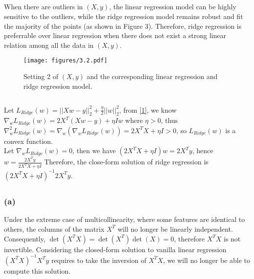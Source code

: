 \documentclass{article}
\begin{document}
        \subsection{}
        When there are outliers in $(X, y)$, the linear regression model can be highly sensitive to the outliers, 
        while the ridge regression model remains robust and fit the majority of the points (as shown in Figure 3). 
        Therefore, ridge regression is preferrable over linear regression when there does not exist a strong linear relation among all the data in $(X, y)$. 
        \vspace{-10pt}
        \begin{figure}[hbt!]
            \centering
            \texttt{[image: figures/3.2.pdf]}
            \caption{Setting 2 of $(X, y)$ and the corresponding linear regression and ridge regression model.}
        \end{figure}
        \vspace{-15pt}

        \subsection{}\label{3.3}
        Let $L_{Ridge}(w)=||Xw-y||_2^2+\frac{\eta}{2}||w||_2^2$, from \ref{1}, we know $\nabla_w L_{Ridge}(w)=2X^T(Xw-y)+\eta Iw$ where $\eta>0$,
        thus $\nabla_w^2L_{Ridge}(w)=\nabla_w(\nabla_wL_{Ridge}(w))=2X^TX+\eta I>0$, so $L_{Ridge}(w)$ is a convex function.\\
        Let $\nabla_wL_{Ridge}(w)=0$, then we have $(2X^TX+\eta I)w=2X^Ty$, hence $w=\frac{2X^Ty}{2X^TX+\eta I}$
        Therefore, the close-form solution of ridge regression is $(2X^TX+\eta I)^{-1}2X^Ty$.
        \subsection{}
            \subsubsection*{(a)}
            Under the extreme case of multicollinearity, where some features are identical to others, 
            the columns of the matrix $X^T$ will no longer be linearly independent. Consequently, $\det(X^TX)=\det(X^T)\det(X)=0$, therefore $X^TX$ is not invertible. 
            Considering the closed-form solution to vanilla linear regression $(X^TX)^{-1}X^Ty$ requires to take the inversion of $X^TX$, 
            we will no longer be able to compute this solution.
            \vspace{-10pt}
\end{document}
